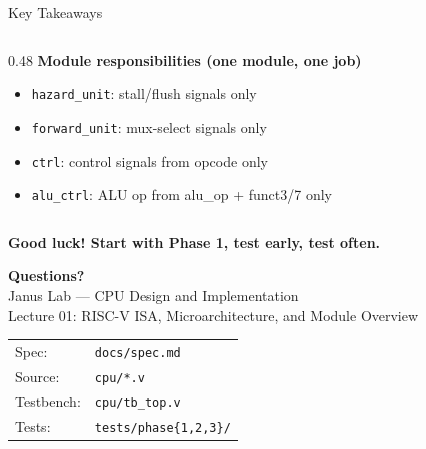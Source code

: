 \documentclass[aspectratio=169,10pt]{beamer}
\begin{document}
\begin{frame}{Key Takeaways}
\begin{columns}[T]
\begin{column}{0.48\textwidth}
      \vspace{0.6em}
      \textbf{Module responsibilities (one module, one job)}
      \begin{itemize}
        \item \texttt{hazard\_unit}: stall/flush signals only
        \item \texttt{forward\_unit}: mux-select signals only
        \item \texttt{ctrl}: control signals from opcode only
        \item \texttt{alu\_ctrl}: ALU op from alu\_op + funct3/7 only
      \end{itemize}
    \end{column}
  \end{columns}

  \vspace{0.6em}
  \begin{center}
    \large\textbf{Good luck! Start with Phase 1, test early, test often.}
  \end{center}
\end{frame}

\begin{frame}
  \begin{center}
    \vspace{1.5em}
    {\Large\textbf{Questions?}}\\[1.5em]
    \large Janus Lab --- CPU Design and Implementation\\[0.5em]
    \normalsize Lecture 01: RISC-V ISA, Microarchitecture, and Module Overview\\[2em]
    \small
    \begin{tabular}{ll}
      Spec:      & \texttt{docs/spec.md} \\
      Source:    & \texttt{cpu/*.v} \\
      Testbench: & \texttt{cpu/tb\_top.v} \\
      Tests:     & \texttt{tests/phase\{1,2,3\}/} \\
    \end{tabular}
  \end{center}
\end{frame}
\end{document}
